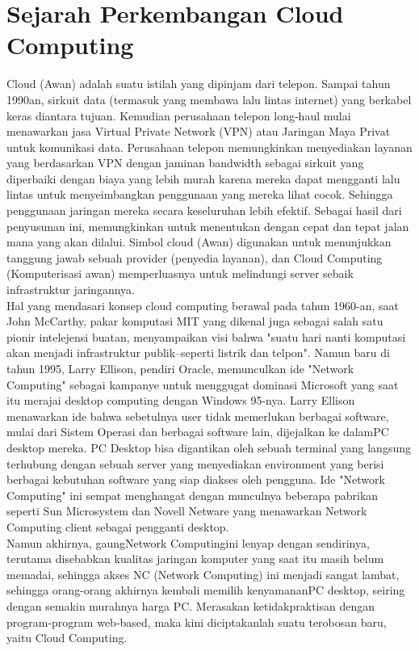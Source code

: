 \section{Sejarah Perkembangan Cloud Computing}
\tab Cloud (Awan) adalah suatu istilah yang dipinjam dari telepon. Sampai tahun 1990an, sirkuit data (termasuk yang membawa lalu lintas internet) yang berkabel keras diantara tujuan. Kemudian perusahaan telepon long-haul mulai menawarkan jasa Virtual Private Network (VPN) atau Jaringan Maya Privat untuk komunikasi data. Perusahaan telepon memungkinkan menyediakan layanan yang berdasarkan VPN dengan jaminan bandwidth sebagai sirkuit yang diperbaiki dengan biaya yang lebih murah karena mereka dapat mengganti lalu lintas untuk menyeimbangkan penggunaan yang mereka lihat cocok. Sehingga penggunaan jaringan mereka secara keseluruhan lebih efektif. Sebagai hasil dari penyusunan ini, memungkinkan untuk menentukan dengan cepat dan tepat jalan mana yang akan dilalui. Simbol cloud (Awan) digunakan untuk menunjukkan tanggung jawab sebuah provider (penyedia layanan), dan Cloud Computing (Komputerisasi awan) memperluasnya untuk melindungi server sebaik infrastruktur jaringannya. \\Hal yang mendasari konsep cloud computing berawal pada tahun 1960-an, saat John McCarthy, pakar komputasi MIT yang dikenal juga sebagai salah satu pionir intelejensi buatan, menyampaikan visi bahwa "suatu hari nanti komputasi akan menjadi infrastruktur publik--seperti listrik dan telpon". Namun baru di tahun 1995, Larry Ellison, pendiri Oracle, memunculkan ide "Network Computing" sebagai kampanye untuk menggugat dominasi Microsoft yang saat itu merajai desktop computing dengan Windows 95-nya. Larry Ellison menawarkan ide bahwa sebetulnya user tidak memerlukan berbagai software, mulai dari Sistem Operasi dan berbagai software lain, dijejalkan ke dalamPC desktop mereka. PC Desktop bisa digantikan oleh sebuah terminal yang langsung terhubung dengan sebuah server yang menyediakan environment yang berisi berbagai kebutuhan software yang siap diakses oleh pengguna. Ide "Network Computing" ini sempat menghangat dengan munculnya beberapa pabrikan seperti Sun Microsystem dan Novell Netware yang menawarkan Network Computing client sebagai pengganti desktop. \\Namun akhirnya, gaungNetwork Computingini lenyap dengan sendirinya, terutama disebabkan kualitas jaringan komputer yang saat itu masih belum memadai, sehingga akses NC (Network Computing) ini menjadi sangat lambat, sehingga orang-orang akhirnya kembali memilih kenyamananPC desktop, seiring dengan semakin murahnya harga PC. Merasakan ketidakpraktisan dengan program-program web-based, maka kini diciptakanlah suatu terobosan baru, yaitu Cloud Computing.
